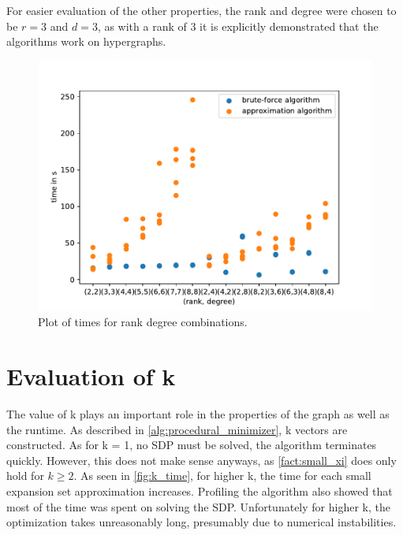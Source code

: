 For easier evaluation of the other properties, the rank and degree were chosen to be $r=3$ and $d=3$, as with a rank of 3 it is explicitly demonstrated that the algorithms work on hypergraphs.
\begin{figure}
	\centering
	\includegraphics[scale=0.8]{figures/rank_degree_combinations_all_logs.pdf}
	\caption[Plot times rank degree combinations]{Plot of times for rank degree combinations.\label{fig:rank_degree_times}}
\end{figure}


\section{Evaluation of k}

The value of k plays an important role in the properties of the graph as well as the runtime. As described in \cref{alg:procedural_minimizer}, k vectors are constructed.
As for k = 1, no SDP must be solved, the algorithm terminates quickly. However, this does not make sense anyways, as \cref{fact:small_xi} does only hold for $k\ge2$.
As seen in \cref{fig:k_time}, for higher k, the time for each small expansion set approximation increases. Profiling the algorithm also showed that most of the time was spent on solving the SDP. Unfortunately for higher k, the optimization takes unreasonably long, presumably due to numerical instabilities.

